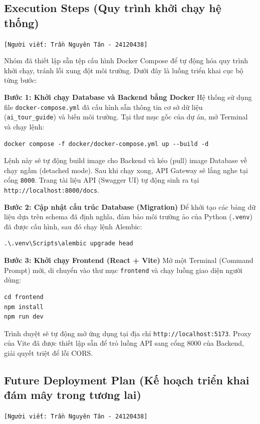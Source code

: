 \subsection{Execution Steps (Quy trình khởi chạy hệ thống)}
\texttt{[Người viết: Trần Nguyên Tân - 24120438]}

Nhóm đã thiết lập sẵn tệp cấu hình Docker Compose để tự động hóa quy trình khởi chạy, tránh lỗi xung đột môi trường. Dưới đây là luồng triển khai cục bộ từng bước:

\textbf{Bước 1: Khởi chạy Database và Backend bằng Docker}
Hệ thống sử dụng file \texttt{docker-compose.yml} đã cấu hình sẵn thông tin cơ sở dữ liệu (\texttt{ai\_tour\_guide}) và biến môi trường. Tại thư mục gốc của dự án, mở Terminal và chạy lệnh:
\begin{verbatim}
docker compose -f docker/docker-compose.yml up --build -d
\end{verbatim}
Lệnh này sẽ tự động build image cho Backend và kéo (pull) image Database về chạy ngầm (detached mode). Sau khi chạy xong, API Gateway sẽ lắng nghe tại cổng \texttt{8000}. Trang tài liệu API (Swagger UI) tự động sinh ra tại \texttt{http://localhost:8000/docs}.

\textbf{Bước 2: Cập nhật cấu trúc Database (Migration)}
Để khởi tạo các bảng dữ liệu dựa trên schema đã định nghĩa, đảm bảo môi trường ảo của Python (\texttt{.venv}) đã được cấu hình, sau đó chạy lệnh Alembic:
\begin{verbatim}
.\.venv\Scripts\alembic upgrade head
\end{verbatim}

\textbf{Bước 3: Khởi chạy Frontend (React + Vite)}
Mở một Terminal (Command Prompt) mới, di chuyển vào thư mục \texttt{frontend} và chạy luồng giao diện người dùng:
\begin{verbatim}
cd frontend
npm install
npm run dev
\end{verbatim}
Trình duyệt sẽ tự động mở ứng dụng tại địa chỉ \texttt{http://localhost:5173}. Proxy của Vite đã được thiết lập sẵn để trỏ luồng API sang cổng 8000 của Backend, giải quyết triệt để lỗi CORS.

\subsection{Future Deployment Plan (Kế hoạch triển khai đám mây trong tương lai)}
\texttt{[Người viết: Trần Nguyên Tân - 24120438]}

